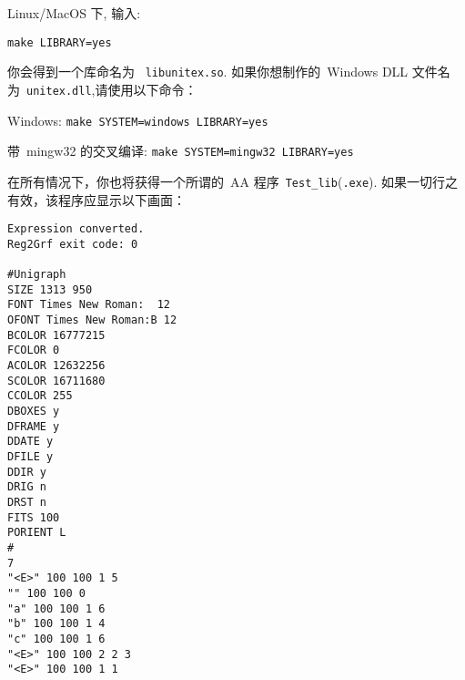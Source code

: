 \bigskip
Linux/MacOS 下, 输入:

\bigskip
\verb+make LIBRARY=yes+

\bigskip
\noindent 你会得到一个库命名为 \ \verb+libunitex.so+. 如果你想制作的\ Windows DLL 文件名为\ \verb+unitex.dll+,请使用以下命令：

\bigskip
Windows: \verb+make SYSTEM=windows LIBRARY=yes+

带\ mingw32 的交叉编译: \verb+make SYSTEM=mingw32 LIBRARY=yes+

\bigskip
\noindent 在所有情况下，你也将获得一个所谓的\ AA 程序\ 
\verb+Test_lib+(\verb+.exe+). 
如果一切行之有效，该程序应显示以下画面：

\begin{verbatim}
Expression converted.
Reg2Grf exit code: 0

#Unigraph
SIZE 1313 950
FONT Times New Roman:  12
OFONT Times New Roman:B 12
BCOLOR 16777215
FCOLOR 0
ACOLOR 12632256
SCOLOR 16711680
CCOLOR 255
DBOXES y
DFRAME y
DDATE y
DFILE y
DDIR y
DRIG n
DRST n
FITS 100
PORIENT L
#
7
"<E>" 100 100 1 5
"" 100 100 0
"a" 100 100 1 6
"b" 100 100 1 4
"c" 100 100 1 6
"<E>" 100 100 2 2 3
"<E>" 100 100 1 1
\end{verbatim}
